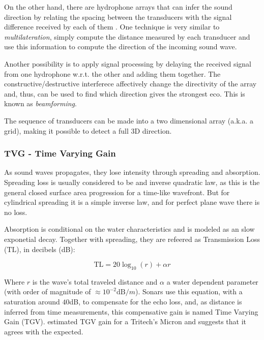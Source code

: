 On the other hand, there are hydrophone arrays that can infer the sound
direction by relating the spacing between the transducers with the signal
difference received by each of them \cite{bearing,beamforming}. One technique is
very similar to \textit{multilateration}, simply compute the distance measured
by each transducer and use this information to compute the direction of the
incoming sound wave.


Another possibility is to apply signal processing by delaying the received
signal from one hydrophone w.r.t. the other and adding them together. The
constructive/destructive interferece affectively change the directivity of the
array and, thus, can be used to find which direction gives the strongest eco.
This is known as \textit{beamforming}.

The sequence of transducers can be made into a two dimensional array
(a.k.a. a grid), making it possible to detect a full 3D direction.

\subsubsection{TVG - Time Varying Gain}\label{sss:tvg}

As sound waves propagates, they lose intensity through spreading and absorption.
Spreading loss is usually considered to be and inverse quadratic
law\cite{Etter2013}, as this is the general closed surface area progression for
a time-like wavefront. But for cylindrical spreading it is a simple inverse law,
and for perfect plane wave there is no loss.

Absorption is conditional on the water characteristics and is modeled as an
slow exponetial decay. Together with spreading, they are refeered as
Transmission Loss ($\text{TL}$), in decibels (dB):

\begin{equation*}
\text{TL} = 20\log_{10}(r) + \alpha r
\end{equation*}

Where $r$ is the wave's total traveled distance and $\alpha$ a water dependent
parameter (with order of magnitude of $\approx 10^{-2} \text{dB}/m$). Sonars use
this equation, with a saturation around $40$dB, to compensate for the echo
loss\cite{chu2006time}, and, as distance is inferred from time measurements,
this compensative gain is named Time Varying Gain (TGV). \citet{chew2013object}
estimated TGV gain for a Tritech's Micron and suggests that it agrees with the
expected.



